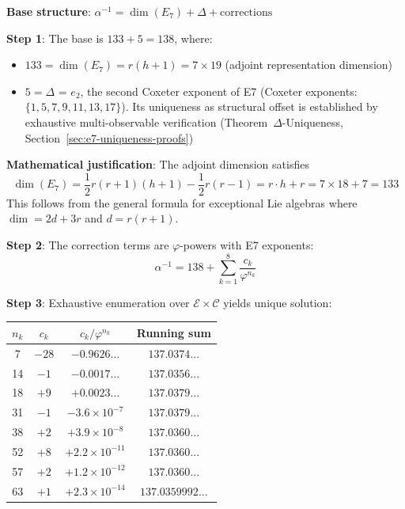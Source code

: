 \documentclass[11pt,a4paper]{article}
\begin{document}
\textbf{Base structure}: $\alpha^{-1} = \dim(E_7) + \Delta + \text{corrections}$

\textbf{Step 1}: The base is $133 + 5 = 138$, where:
\begin{itemize}
\item $133 = \dim(E_7) = r(h+1) = 7 \times 19$ (adjoint representation dimension)
\item $5 = \Delta$ = $e_2$, the second Coxeter exponent of E7 (Coxeter exponents: $\{1, 5, 7, 9, 11, 13, 17\}$). Its uniqueness as structural offset is established by exhaustive multi-observable verification (Theorem~$\Delta$-Uniqueness, Section~\ref{sec:e7-uniqueness-proofs})
\end{itemize}

\textbf{Mathematical justification}: The adjoint dimension satisfies
\begin{equation}
\dim(E_7) = \frac{1}{2}r(r+1)(h+1) - \frac{1}{2}r(r-1) = r \cdot h + r = 7 \times 18 + 7 = 133
\end{equation}
This follows from the general formula for exceptional Lie algebras where $\dim = 2d + 3r$ and $d = r(r+1)$.

\textbf{Step 2}: The correction terms are $\varphi$-powers with E7 exponents:
\begin{equation}
\alpha^{-1} = 138 + \sum_{k=1}^{8} \frac{c_k}{\varphi^{n_k}}
\end{equation}

\textbf{Step 3}: Exhaustive enumeration over $\mathcal{E} \times \mathcal{C}$ yields unique solution:
\begin{center}
\begin{tabular}{|c|c|c|c|}
\hline
\textbf{$n_k$} & \textbf{$c_k$} & \textbf{$c_k/\varphi^{n_k}$} & \textbf{Running sum} \\
\hline
7 & $-28$ & $-0.9626...$ & $137.0374...$ \\
14 & $-1$ & $-0.0017...$ & $137.0356...$ \\
18 & $+9$ & $+0.0023...$ & $137.0379...$ \\
31 & $-1$ & $-3.6 \times 10^{-7}$ & $137.0379...$ \\
38 & $+2$ & $+3.9 \times 10^{-8}$ & $137.0360...$ \\
52 & $+8$ & $+2.2 \times 10^{-11}$ & $137.0360...$ \\
57 & $+2$ & $+1.2 \times 10^{-12}$ & $137.0360...$ \\
63 & $+1$ & $+2.3 \times 10^{-14}$ & $137.0359992...$ \\
\hline
\end{tabular}
\end{center}
\end{document}
